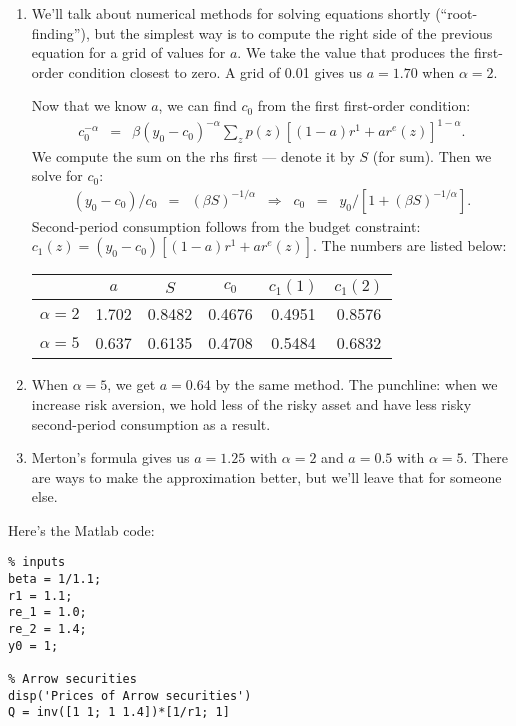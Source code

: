 \documentclass[11pt]{article}
\begin{document}
\begin{enumerate}
\begin{enumerate}
\item
We'll talk about numerical methods for solving equations shortly (``root-finding''),
but the simplest way is to compute the right side of the previous equation
for a grid of values for $a$.
We take the value that produces the first-order condition closest to zero.
A grid of 0.01 gives us $a=1.70$ when $\alpha=2$.

Now that we know $a$, we can find $c_0$ from the first first-order condition:
\begin{eqnarray*}
    c_0^{-\alpha}  &=&  \beta (y_0-c_0)^{-\alpha}
            \sum_z p(z) [ (1-a)r^1 + a r^e(z)]^{1-\alpha}  .
\end{eqnarray*}
We compute the sum on the rhs first --- denote it by $S$ (for sum).
Then we solve for $c_0$:
\begin{eqnarray*}
    (y_0-c_0)/c_0 &=& (\beta S)^{-1/\alpha}
        \;\;\Rightarrow\;\;
        c_0  \;\;=\;\; y_0 /[ 1 + (\beta S)^{-1/\alpha}] .
\end{eqnarray*}
Second-period consumption follows from the budget constraint:
$c_1(z)=  (y_0-c_0)[(1-a) r^1 + a r^e(z)] $.
The numbers are listed below:
\begin{center}
\begin{tabular}{lccccc}
\toprule
                &  $a$  &  $S$    & $c_0$   &  $c_1(1)$ &  $c_1(2)$  \\
\midrule
$\alpha = 2$    & 1.702 & 0.8482  & 0.4676  & 0.4951    & 0.8576 \\
$\alpha = 5$    & 0.637 & 0.6135  & 0.4708  & 0.5484    & 0.6832 \\
\bottomrule
\end{tabular}
\end{center}

\item When $\alpha=5$, we get $a=0.64$ by the same method.
The punchline:  when we increase risk aversion, we hold less of the risky asset
and have less risky second-period consumption as a result.

\item Merton's formula gives us $a= 1.25$ with $\alpha = 2$
and $a = 0.5 $ with $\alpha = 5$.
There are ways to make the approximation better, but we'll leave that for someone else.
\end{enumerate}
%
Here's the Matlab code:
\begin{verbatim}
% inputs
beta = 1/1.1;
r1 = 1.1;
re_1 = 1.0;
re_2 = 1.4;
y0 = 1;

% Arrow securities
disp('Prices of Arrow securities')
Q = inv([1 1; 1 1.4])*[1/r1; 1]


\end{verbatim}
\end{enumerate}
\end{document}
